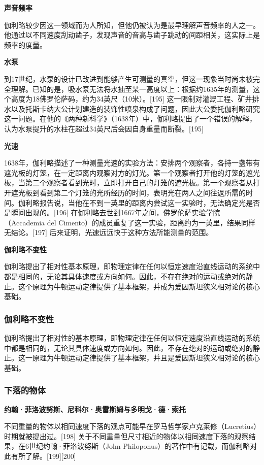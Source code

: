 \textbf{声音频率}  

伽利略较少因这一领域而为人所知，但他仍被认为是最早理解声音频率的人之一。他通过以不同速度刮动凿子，发现声音的音高与凿子跳动的间距相关，这实际上是频率的度量。

\textbf{水泵}  

到17世纪，水泵的设计已改进到能够产生可测量的真空，但这一现象当时尚未被完全理解。已知的是，吸水泵无法将水抽至某一高度以上：根据约1635年的测量，这个高度为18佛罗伦萨码，约为34英尺（10米）。[195] 这一限制对灌溉工程、矿井排水以及托斯卡纳大公计划建造的装饰性喷泉构成了问题，因此大公委托伽利略研究这一问题。在他的《两种新科学》（1638年）中，伽利略提出了一个错误的解释，认为水泵提升的水柱在超过34英尺后会因自身重量而断裂。[195]  

\textbf{光速}   

1638年，伽利略描述了一种测量光速的实验方法：安排两个观察者，各持一盏带有遮光板的灯笼，在一定距离内观察对方的灯光。第一个观察者打开他的灯笼的遮光板，当第二个观察者看到光时，立即打开自己的灯笼的遮光板。第一个观察者从打开遮光板到看到第二个灯笼的光所经历的时间，表明光在两人之间往返所需的时间。伽利略报告说，当他在不到一英里的距离内尝试这一实验时，无法确定光是否是瞬间出现的。[196] 在伽利略去世到1667年之间，佛罗伦萨实验学院（Accademia del Cimento）的成员重复了这一实验，距离约为一英里，结果同样无结论。[197] 后来证明，光速远远快于这种方法所能测量的范围。  

\textbf{伽利略不变性} 

伽利略提出了相对性基本原理，即物理定律在任何以恒定速度沿直线运动的系统中都是相同的，无论其具体速度或方向如何。因此，不存在绝对的运动或绝对的静止。这个原理为牛顿运动定律提供了基本框架，并成为爱因斯坦狭义相对论的核心基础。  

\subsubsection{伽利略不变性} 
伽利略提出了相对性的基本原理，即物理定律在任何以恒定速度沿直线运动的系统中都是相同的，无论其具体速度或方向如何。因此，不存在绝对的运动或绝对的静止。这一原理为牛顿运动定律提供了基本框架，并且是爱因斯坦狭义相对论的核心基础。

\subsubsection{下落的物体}  
\textbf{约翰·菲洛波努斯、尼科尔·奥雷斯姆与多明戈·德·索托}  

不同重量的物体以相同速度下落的观点可能早在罗马哲学家卢克莱修（Lucretius）时期就被提出过。[198] 关于不同重量但尺寸相近的物体以相同速度下落的观察结果，在6世纪约翰·菲洛波努斯（John Philoponus）的著作中有记载，而伽利略对此有所了解。[199][200]  

